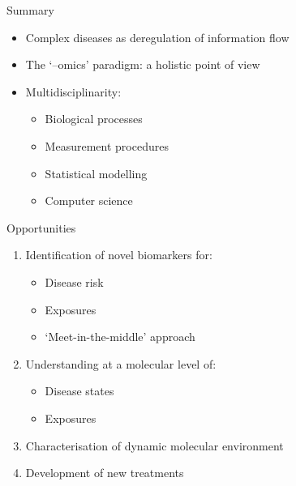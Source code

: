 \begin{frame}{Summary}
    \begin{itemize}
        \setlength{\itemsep}{0.5em}
        \item Complex diseases as deregulation of information flow
        \item The `--omics' paradigm: a holistic point of view
        \item Multidisciplinarity:
              \begin{itemize}
                  \item Biological processes
                  \item Measurement procedures
                  \item Statistical modelling
                  \item Computer science
              \end{itemize}
    \end{itemize}
\end{frame}

\begin{frame}{Opportunities}
    \begin{enumerate}
        \setlength{\itemsep}{0.5em}
        \item Identification of novel biomarkers for:
              \begin{itemize}
                  \item Disease risk
                  \item Exposures
                  \item `\alert{Meet\hyp{}in\hyp{}the\hyp{}middle}' approach
              \end{itemize}
        \item Understanding at a molecular level of:
              \begin{itemize}
                  \item Disease states
                  \item Exposures
              \end{itemize}
        \item Characterisation of \alert{dynamic} molecular environment
        \item Development of new treatments
    \end{enumerate}
\end{frame}

